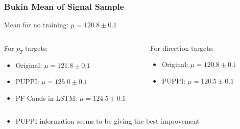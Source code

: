 \documentclass{beamer}
\begin{document}
\begin{frame}
  \frametitle{Bukin Mean of Signal Sample}

  Mean for no training: $\mu = 120.8 \pm 0.1$

  \vspace{12pt}

  \begin{columns}
    \begin{column}{0.5\linewidth}
      For $p_T$ targets:
      \begin{itemize}
      \item Original: $\mu = 121.8 \pm 0.1$
      \item PUPPI: $\mu = 125.0 \pm 0.1$
      \item PF Cands in LSTM: $\mu = 124.5 \pm 0.1$
      \end{itemize}
    \end{column}
    \begin{column}{0.5\linewidth}
      For direction targets:
      \begin{itemize}
      \item Original: $\mu = 120.8 \pm 0.1$
      \item PUPPI: $\mu = 120.5 \pm 0.1$
        \phantom{\item PF Cands in LSTM: \\ $\mu = 12.22$}
        \phantom{\item PF Cands in LSTM: \\ $\mu = 12.22$}
      \end{itemize}
    \end{column}
  \end{columns}

  \begin{itemize}
  \item PUPPI information seems to be giving the best improvement
  \end{itemize}


\end{frame}


\end{document}
